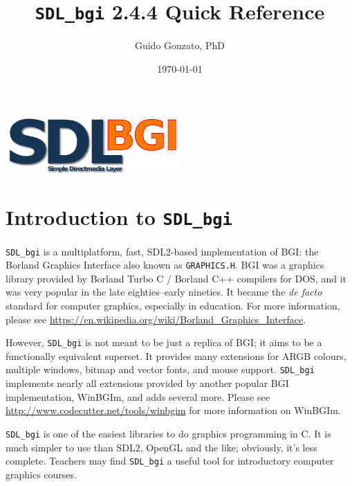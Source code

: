 \documentclass[a4paper,12pt]{article}
\newcommand{\SDLbgi}{\texttt{SDL\_bgi}}
\newcommand{\version}{2.4.4}        %
\begin{document}
\title{\SDLbgi{} \version{} Quick Reference}

\author{Guido Gonzato, PhD}

\date{\today}

\maketitle

\begin{center}
  \includegraphics[width=0.5\textwidth]{SDL_bgi_logo.png}
\end{center}

{\small \tableofcontents}


\section{Introduction to \SDLbgi}

\SDLbgi{} is a multiplatform, fast, SDL2-based implementation of BGI:
the Borland Graphics Interface also known as \texttt{GRAPHICS.H}. BGI
was a graphics library provided by Borland Turbo C / Borland C++
compilers for DOS, and it was very popular in the late eighties--early
nineties. It became the \emph{de facto} standard for computer
graphics, especially in education. For more information, please see 
\url{https://en.wikipedia.org/wiki/Borland_Graphics_Interface}.


However, \SDLbgi{} is not meant to be just a replica of BGI; it aims
to be a functionally equivalent superset. It provides many extensions
for ARGB colours, multiple windows, bitmap and vector fonts, and mouse
support. \SDLbgi{} implements nearly all extensions provided by
another popular BGI implementation, WinBGIm, and adds several more.
Please see \url{http://www.codecutter.net/tools/winbgim} for more
information on WinBGIm.

\SDLbgi{} is one of the easiest libraries to do graphics programming
in C. It is much simpler to use than SDL2, OpenGL and the like;
obviously, it's less complete. Teachers may find \SDLbgi{} a useful
tool for introductory computer graphics courses.
\end{document}
